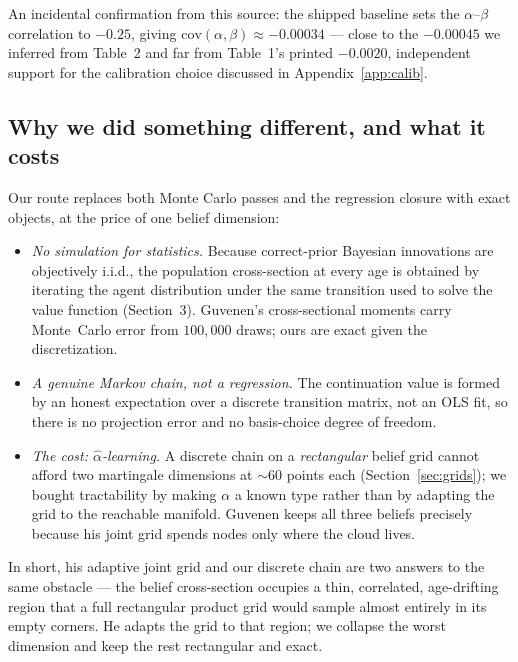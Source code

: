 \documentclass[11pt,fleqn]{article}
\begin{document}
An incidental confirmation from this source: the shipped baseline sets the
$\alpha$--$\beta$ correlation to $-0.25$, giving $\mathrm{cov}(\alpha,\beta)\approx
-0.00034$ --- close to the $-0.00045$ we inferred from Table~2 and far from Table~1's
printed $-0.0020$, independent support for the calibration choice discussed in
Appendix~\ref{app:calib}.

\subsection{Why we did something different, and what it costs}

Our route replaces both Monte Carlo passes and the regression closure with exact
objects, at the price of one belief dimension:

\begin{itemize}
\item \emph{No simulation for statistics.} Because correct-prior Bayesian innovations
are objectively i.i.d., the population cross-section at every age is obtained by
iterating the agent distribution under the same transition used to solve the value
function (Section~3). Guvenen's cross-sectional moments carry Monte~Carlo error from
$100{,}000$ draws; ours are exact given the discretization.

\item \emph{A genuine Markov chain, not a regression.} The continuation value is
formed by an honest expectation over a discrete transition matrix, not an OLS fit, so
there is no projection error and no basis-choice degree of freedom.

\item \emph{The cost: $\hat\alpha$-learning.} A discrete chain on a \emph{rectangular}
belief grid cannot afford two martingale dimensions at $\sim$60 points each
(Section~\ref{sec:grids}); we bought tractability by making $\alpha$ a known type
rather than by adapting the grid to the reachable manifold. Guvenen keeps all three
beliefs precisely because his joint grid spends nodes only where the cloud lives.
\end{itemize}

In short, his adaptive joint grid and our discrete chain are two answers to the same
obstacle --- the belief cross-section occupies a thin, correlated, age-drifting region
that a full rectangular product grid would sample almost entirely in its empty corners.
He adapts the grid to that region; we collapse the worst dimension and keep the rest
rectangular and exact.
\end{document}
